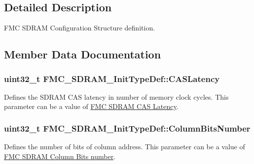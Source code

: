 \subsection{Detailed Description}
F\+MC S\+D\+R\+AM Configuration Structure definition. 

\subsection{Member Data Documentation}
\subsubsection[{\texorpdfstring{C\+A\+S\+Latency}{CASLatency}}]{\setlength{\rightskip}{0pt plus 5cm}uint32\+\_\+t F\+M\+C\+\_\+\+S\+D\+R\+A\+M\+\_\+\+Init\+Type\+Def\+::\+C\+A\+S\+Latency}\hypertarget{struct_f_m_c___s_d_r_a_m___init_type_def_aa55520658496327bbc831183b8dead9e}{}\label{struct_f_m_c___s_d_r_a_m___init_type_def_aa55520658496327bbc831183b8dead9e}
Defines the S\+D\+R\+AM C\+AS latency in number of memory clock cycles. This parameter can be a value of \hyperlink{group___f_m_c___s_d_r_a_m___c_a_s___latency}{F\+MC S\+D\+R\+AM C\+AS Latency}. 
\subsubsection[{\texorpdfstring{Column\+Bits\+Number}{ColumnBitsNumber}}]{\setlength{\rightskip}{0pt plus 5cm}uint32\+\_\+t F\+M\+C\+\_\+\+S\+D\+R\+A\+M\+\_\+\+Init\+Type\+Def\+::\+Column\+Bits\+Number}\hypertarget{struct_f_m_c___s_d_r_a_m___init_type_def_a2c498d704e18f17cc41c6e1e50d45447}{}\label{struct_f_m_c___s_d_r_a_m___init_type_def_a2c498d704e18f17cc41c6e1e50d45447}
Defines the number of bits of column address. This parameter can be a value of \hyperlink{group___f_m_c___s_d_r_a_m___column___bits__number}{F\+MC S\+D\+R\+AM Column Bits number}. 
